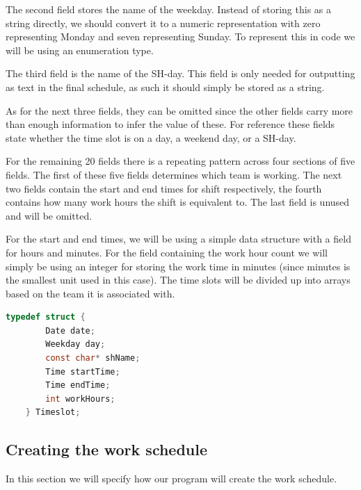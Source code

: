 The second field stores the name of the weekday. Instead of storing this as a string directly, we should convert it to a numeric representation with zero representing Monday and seven representing Sunday. To represent this in code we will be using an enumeration type.

The third field is the name of the SH-day. This field is only needed for outputting as text in the final schedule, as such it should simply be stored as a string.

As for the next three fields, they can be omitted since the other fields carry more than enough information to infer the value of these. For reference these fields state whether the time slot is on a day, a weekend day, or a SH-day.

For the remaining 20 fields there is a repeating pattern across four sections of five fields. The first of these five fields determines which team is working. The next two fields contain the start and end times for shift respectively, the fourth contains how many work hours the shift is equivalent to. The last field is unused and will be omitted.

For the start and end times, we will be using a simple data structure with a field for hours and minutes. For the field containing the work hour count we will simply be using an integer for storing the work time in minutes (since minutes is the smallest unit used in this case). 
The time slots will be divided up into arrays based on the team it is associated with.

\begin{lstlisting}[caption={Example data structure.},language=C]
    typedef struct {
        Date date;
        Weekday day;
        const char* shName;
        Time startTime;
        Time endTime;
        int workHours;
    } Timeslot;
\end{lstlisting}

\subsection{Creating the work schedule}
In this section we will specify how our program will create the work schedule.

